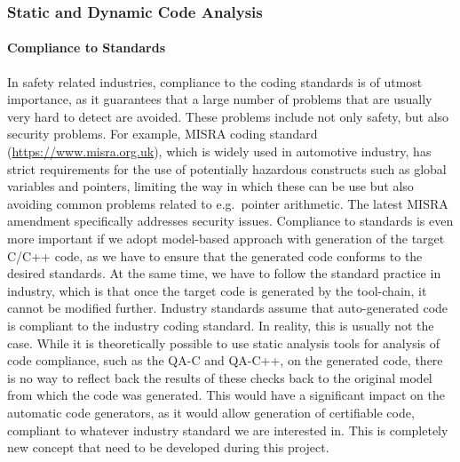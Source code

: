 \documentclass[a4paper,11pt]{article}
\begin{document}
\subsubsection{Static and Dynamic Code Analysis}
\label{sect:codeAnalysis}

\paragraph{Compliance to Standards}
In safety related industries, compliance to the coding standards is
of utmost importance, as it guarantees that a large number of problems that are usually
very hard to detect are avoided. These problems include not only safety, but also security problems. For example, MISRA coding standard ({\url{https://www.misra.org.uk}}), which is
widely used in automotive industry, has strict requirements for the use of potentially
hazardous constructs such as global variables and pointers, limiting the way in
which these can be use but also avoiding common problems related to e.g.~pointer arithmetic. 
The latest MISRA amendment specifically addresses security issues.
Compliance to standards is even more important if we adopt model-based approach with
generation of the target C/C++ code, as we have to ensure that the generated code conforms
to the desired standards. At the same time, we have to follow the standard practice in industry,
which is that once the target code is generated by the tool-chain, it cannot be modified further. 
Industry standards assume that auto-generated code is compliant to the industry coding 
standard. In reality, this is usually not the case. While it is theoretically possible to 
use static analysis tools for analysis of code 
compliance, such as the \PRLshort QA-C and QA-C++, on the 
generated code, there is no way to reflect back the results of these checks back to the original model
from which the code was generated. This would have a significant impact on the automatic
code generators, as it would allow generation of certifiable code, compliant to
whatever industry standard we are interested in. This is completely new concept that need to be developed during this project.
\end{document}
